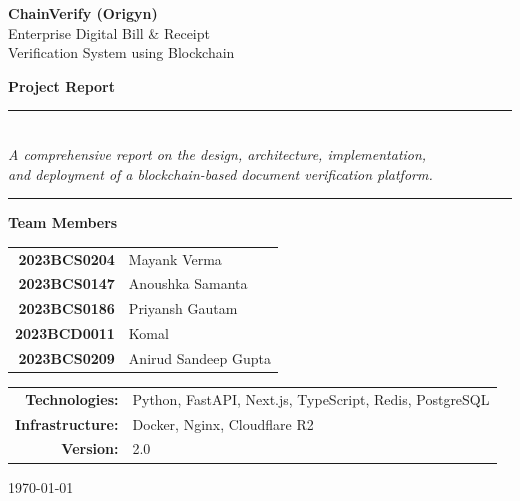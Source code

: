 \documentclass[12pt, a4paper]{report}
\begin{document}
\begin{titlepage}
    \centering
    \vspace*{1cm}

    {\Huge\bfseries ChainVerify (Origyn)}\\[0.5cm]
    {\LARGE Enterprise Digital Bill \& Receipt\\Verification System using Blockchain}

    \vspace{1.5cm}

    {\large\textbf{Project Report}}

    \vspace{2cm}

    \rule{\textwidth}{0.4pt}\\[0.4cm]
    {\large
    \textit{A comprehensive report on the design, architecture, implementation,\\
    and deployment of a blockchain-based document verification platform.}}\\[0.4cm]
    \rule{\textwidth}{0.4pt}

    \vspace{2cm}

    {\large\textbf{Team Members}}\\[0.5cm]
    {\large
    \begin{tabular}{r l}
        \textbf{2023BCS0204} & Mayank Verma \\
        \textbf{2023BCS0147} & Anoushka Samanta \\
        \textbf{2023BCS0186} & Priyansh Gautam \\
        \textbf{2023BCD0011} & Komal \\
        \textbf{2023BCS0209} & Anirud Sandeep Gupta \\
    \end{tabular}
    }

    \vspace{1.5cm}

    {\large
    \begin{tabular}{rl}
        \textbf{Technologies:} & Python, FastAPI, Next.js, TypeScript, Redis, PostgreSQL \\
        \textbf{Infrastructure:} & Docker, Nginx, Cloudflare R2 \\
        \textbf{Version:} & 2.0 \\
    \end{tabular}
    }

    \vfill

    {\large \today}
\end{titlepage}
\end{document}
